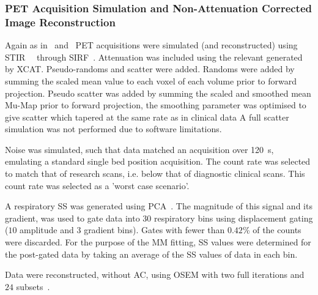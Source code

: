             \subsubsection{PET Acquisition Simulation and Non-Attenuation Corrected Image Reconstruction} \label{sec:comparison_of_motion_correction_methods_incorporating_motion_modelling_for_pet/ct_using_a_single_breath_hold_attenuation_map_pet_acquisition_simulation_and_non_attenuation_corrected_image_reconstruction}
                Again as in~ and~ \gls{PET} acquisitions were simulated (and reconstructed) using \gls{STIR}~\parencite{Thielemans2012}~\parencite{Nikos2019} through \gls{SIRF}~\parencite{Ovtchinnikov2017}. Attenuation was included using the relevant  generated by \gls{XCAT}. Pseudo-randoms and scatter were added. Randoms were added by summing the scaled mean value to each voxel of each volume prior to forward projection. Pseudo scatter was added by summing the scaled and smoothed mean \gls{Mu-Map} prior to forward projection, the smoothing parameter was optimised to give scatter which tapered at the same rate as in clinical data A full scatter simulation was not performed due to software limitations.
                
                Noise was simulated, such that data matched an acquisition over \SI{120}{\second}, emulating a standard single bed position acquisition. The count rate was selected to match that of research scans, i.e. below that of diagnostic clinical scans. This count rate was selected as a 'worst case scenario'.
                
                A respiratory \gls{SS} was generated using \gls{PCA}~\parencite{Thielemans2011}. The magnitude of this signal and its gradient, was used to gate data into $30$ respiratory bins using displacement gating ($10$ amplitude and $3$ gradient bins). Gates with fewer than $0.42$\% of the counts were discarded. For the purpose of the \gls{MM} fitting, \gls{SS} values were determined for the post-gated data by taking an average of the \gls{SS} values of data in each bin.
                
                Data were reconstructed, without \gls{AC}, using \gls{OSEM} with two full iterations and $24$ subsets~\parencite{Hudson1994}.
            

